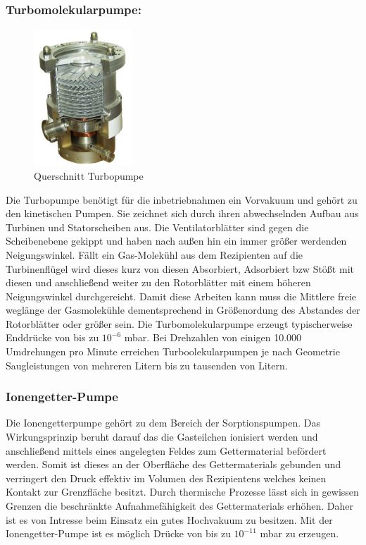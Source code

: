 \subsubsection{Turbomolekularpumpe:}
\begin{figure}
    \vspace{-1cm}
    \centering
    \includegraphics[width=0.33\textwidth]{./picture/Turbo.jpg}
    \caption{Querschnitt Turbopumpe \cite{Turbo}}
    \label{fig:Turbo}
    \vspace{-0.5cm}
\end{figure}
Die Turbopumpe benötigt für die inbetriebnahmen ein Vorvakuum und gehört zu den kinetischen Pumpen. Sie zeichnet sich durch ihren abwechselnden Aufbau aus Turbinen und Statorscheiben aus. Die Ventilatorblätter sind gegen die Scheibenebene gekippt und haben nach außen hin ein immer größer werdenden Neigungswinkel. Fällt ein Gas-Molekühl aus dem Rezipienten auf die Turbinenflügel wird dieses kurz von diesen Absorbiert, Adsorbiert bzw Stößt mit diesen und anschließend weiter zu den Rotorblätter mit einem höheren Neigungswinkel durchgereicht. Damit diese Arbeiten kann muss die Mittlere freie weglänge der Gasmolekühle dementsprechend in Größenordung des Abstandes der Rotorblätter oder größer sein. Die Turbomolekularpumpe erzeugt typischerweise Enddrücke von bis zu $10^{-6}$ mbar. Bei Drehzahlen von einigen 10.000 Umdrehungen pro Minute erreichen Turboolekularpumpen je nach Geometrie Saugleistungen von mehreren Litern bis zu tausenden von Litern.

\subsubsection{Ionengetter-Pumpe}
Die Ionengetterpumpe gehört zu dem Bereich der Sorptionspumpen. Das Wirkungsprinzip beruht darauf das die Gasteilchen ionisiert werden und anschließend mittels eines angelegten Feldes zum Gettermaterial befördert werden. Somit ist dieses an der Oberfläche des Gettermaterials gebunden und verringert den Druck effektiv im Volumen des Rezipientens welches keinen Kontakt zur Grenzfläche besitzt. Durch thermische Prozesse lässt sich in gewissen Grenzen die beschränkte Aufnahmefähigkeit des Gettermaterials erhöhen. Daher ist es von Intresse beim Einsatz ein gutes Hochvakuum zu besitzen. Mit der Ionengetter-Pumpe ist es möglich Drücke von bis zu $10^{-11}$ mbar zu erzeugen.

